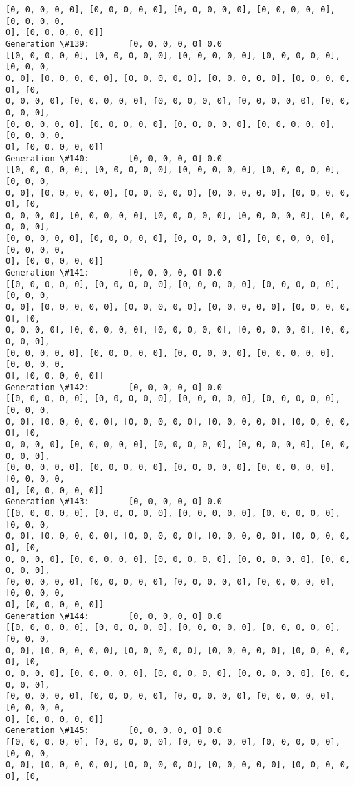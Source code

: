 \documentclass[11pt]{article}
\begin{document}
\begin{Verbatim}[commandchars=\\\{\}]
[0, 0, 0, 0, 0], [0, 0, 0, 0, 0], [0, 0, 0, 0, 0], [0, 0, 0, 0, 0], [0, 0, 0, 0,
0], [0, 0, 0, 0, 0]]
Generation \#139:        [0, 0, 0, 0, 0] 0.0
[[0, 0, 0, 0, 0], [0, 0, 0, 0, 0], [0, 0, 0, 0, 0], [0, 0, 0, 0, 0], [0, 0, 0,
0, 0], [0, 0, 0, 0, 0], [0, 0, 0, 0, 0], [0, 0, 0, 0, 0], [0, 0, 0, 0, 0], [0,
0, 0, 0, 0], [0, 0, 0, 0, 0], [0, 0, 0, 0, 0], [0, 0, 0, 0, 0], [0, 0, 0, 0, 0],
[0, 0, 0, 0, 0], [0, 0, 0, 0, 0], [0, 0, 0, 0, 0], [0, 0, 0, 0, 0], [0, 0, 0, 0,
0], [0, 0, 0, 0, 0]]
Generation \#140:        [0, 0, 0, 0, 0] 0.0
[[0, 0, 0, 0, 0], [0, 0, 0, 0, 0], [0, 0, 0, 0, 0], [0, 0, 0, 0, 0], [0, 0, 0,
0, 0], [0, 0, 0, 0, 0], [0, 0, 0, 0, 0], [0, 0, 0, 0, 0], [0, 0, 0, 0, 0], [0,
0, 0, 0, 0], [0, 0, 0, 0, 0], [0, 0, 0, 0, 0], [0, 0, 0, 0, 0], [0, 0, 0, 0, 0],
[0, 0, 0, 0, 0], [0, 0, 0, 0, 0], [0, 0, 0, 0, 0], [0, 0, 0, 0, 0], [0, 0, 0, 0,
0], [0, 0, 0, 0, 0]]
Generation \#141:        [0, 0, 0, 0, 0] 0.0
[[0, 0, 0, 0, 0], [0, 0, 0, 0, 0], [0, 0, 0, 0, 0], [0, 0, 0, 0, 0], [0, 0, 0,
0, 0], [0, 0, 0, 0, 0], [0, 0, 0, 0, 0], [0, 0, 0, 0, 0], [0, 0, 0, 0, 0], [0,
0, 0, 0, 0], [0, 0, 0, 0, 0], [0, 0, 0, 0, 0], [0, 0, 0, 0, 0], [0, 0, 0, 0, 0],
[0, 0, 0, 0, 0], [0, 0, 0, 0, 0], [0, 0, 0, 0, 0], [0, 0, 0, 0, 0], [0, 0, 0, 0,
0], [0, 0, 0, 0, 0]]
Generation \#142:        [0, 0, 0, 0, 0] 0.0
[[0, 0, 0, 0, 0], [0, 0, 0, 0, 0], [0, 0, 0, 0, 0], [0, 0, 0, 0, 0], [0, 0, 0,
0, 0], [0, 0, 0, 0, 0], [0, 0, 0, 0, 0], [0, 0, 0, 0, 0], [0, 0, 0, 0, 0], [0,
0, 0, 0, 0], [0, 0, 0, 0, 0], [0, 0, 0, 0, 0], [0, 0, 0, 0, 0], [0, 0, 0, 0, 0],
[0, 0, 0, 0, 0], [0, 0, 0, 0, 0], [0, 0, 0, 0, 0], [0, 0, 0, 0, 0], [0, 0, 0, 0,
0], [0, 0, 0, 0, 0]]
Generation \#143:        [0, 0, 0, 0, 0] 0.0
[[0, 0, 0, 0, 0], [0, 0, 0, 0, 0], [0, 0, 0, 0, 0], [0, 0, 0, 0, 0], [0, 0, 0,
0, 0], [0, 0, 0, 0, 0], [0, 0, 0, 0, 0], [0, 0, 0, 0, 0], [0, 0, 0, 0, 0], [0,
0, 0, 0, 0], [0, 0, 0, 0, 0], [0, 0, 0, 0, 0], [0, 0, 0, 0, 0], [0, 0, 0, 0, 0],
[0, 0, 0, 0, 0], [0, 0, 0, 0, 0], [0, 0, 0, 0, 0], [0, 0, 0, 0, 0], [0, 0, 0, 0,
0], [0, 0, 0, 0, 0]]
Generation \#144:        [0, 0, 0, 0, 0] 0.0
[[0, 0, 0, 0, 0], [0, 0, 0, 0, 0], [0, 0, 0, 0, 0], [0, 0, 0, 0, 0], [0, 0, 0,
0, 0], [0, 0, 0, 0, 0], [0, 0, 0, 0, 0], [0, 0, 0, 0, 0], [0, 0, 0, 0, 0], [0,
0, 0, 0, 0], [0, 0, 0, 0, 0], [0, 0, 0, 0, 0], [0, 0, 0, 0, 0], [0, 0, 0, 0, 0],
[0, 0, 0, 0, 0], [0, 0, 0, 0, 0], [0, 0, 0, 0, 0], [0, 0, 0, 0, 0], [0, 0, 0, 0,
0], [0, 0, 0, 0, 0]]
Generation \#145:        [0, 0, 0, 0, 0] 0.0
[[0, 0, 0, 0, 0], [0, 0, 0, 0, 0], [0, 0, 0, 0, 0], [0, 0, 0, 0, 0], [0, 0, 0,
0, 0], [0, 0, 0, 0, 0], [0, 0, 0, 0, 0], [0, 0, 0, 0, 0], [0, 0, 0, 0, 0], [0,

\end{Verbatim}
\end{document}
